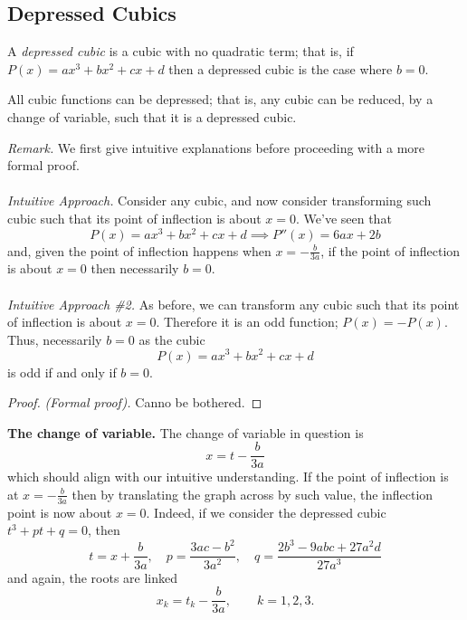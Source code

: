 \documentclass[12pt]{article}
\begin{document}
\subsection{Depressed Cubics}
\begin{dfn}
A \textit{depressed cubic} is a cubic with no quadratic term; that is, if $P(x) = ax^3 
+ bx^2 + cx + d$ then a depressed cubic is the case where $b = 0$.
\end{dfn}
\begin{thm}
All cubic functions can be depressed; that is, any cubic can be reduced, by a change of variable, such that it is a depressed cubic.
\end{thm}
\textit{Remark.} We first give intuitive explanations before proceeding with a more formal proof.\\\\
\textit{Intuitive Approach.} Consider any cubic, and now consider transforming such cubic such that its point of inflection is about $x = 0$. We've seen that
\begin{equation*}
    P(x) = ax^3 + bx^2 + cx + d \implies P''(x) = 6ax + 2b
\end{equation*}
and, given the point of inflection happens when $x = -\frac{b}{3a}$, if the point of inflection is about $x = 0$ then necessarily $b = 0$.\\\\
\textit{Intuitive Approach \#2.} As before, we can transform any cubic such that its point of inflection is about $x = 0$. Therefore it is an odd function; $P(x) = -P(x)$. Thus, necessarily $b = 0$ as the cubic
\begin{equation*}
    P(x) = ax^3 + bx^2 + cx + d
\end{equation*}
is odd if and only if $b = 0$.
\begin{proof}
    \textit{(Formal proof).} Canno be bothered.
\end{proof}

\noindent \textbf{The change of variable.} The change of variable in question is
\begin{equation*}
    x = t - \frac{b}{3a}
\end{equation*}
which should align with our intuitive understanding. If the point of inflection is at $x = -\frac{b}{3a}$ then by translating the graph across by such value, the inflection point is now about $x = 0$. Indeed, if we consider the depressed cubic $t^3 + pt + q = 0$, then
\begin{equation*}
    t = x + \frac{b}{3a}, \quad p =\frac{3ac - b^2}{3a^2}, \quad q = \frac{2b^3 - 9abc + 27a^2d}{27a^3}
\end{equation*}
and again, the roots are linked
\begin{equation*}
    x_k = t_k - \frac{b}{3a},\qquad k = 1,2,3.
\end{equation*}
\end{document}
